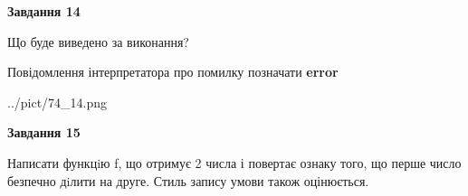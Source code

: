 \documentclass[11pt, ukrainian]{article}
\begin{document}
{\begin {large}
{\begin {center}\textbf{Завдання 14}\end {center}}\par
Що буде виведено за виконання? \par
Повідомлення інтерпретатора про помилку позначати \textbf{error}

\begin{center}
	{../pict/74_14.png}
\end{center}
\newpage

{\begin {center}\textbf{Завдання 15}\end {center}}\par

Написати функцiю f, що отримує 2 числа і повертає ознаку того, що перше число безпечно дiлити на друге. Стиль запису умови також оцінюється.\par
\newpage

\end {large}}
\end{document}
